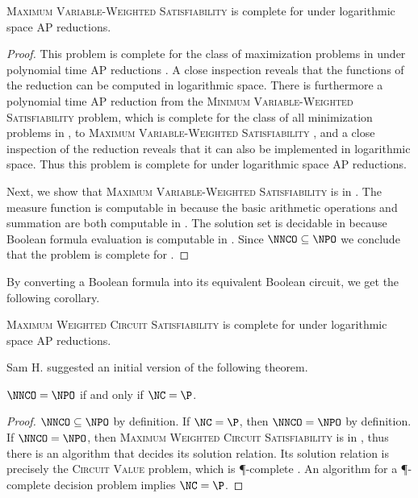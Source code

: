 \documentclass[]{article}
\begin{document}
\begin{theorem}
  \textsc{Maximum Variable-Weighted Satisfiability} is complete for \NNCO{} under logarithmic space AP reductions.
\end{theorem}
\begin{proof}
  This problem is complete for the class of maximization problems in \NPO{} under polynomial time AP reductions \cite[Theorem~3.1]{om87}.
  A close inspection reveals that the functions of the reduction can be computed in logarithmic space.
  There is furthermore a polynomial time AP reduction from the \textsc{Minimum Variable-Weighted Satisfiability} problem, which is complete for the class of all minimization problems in \NPO, to \textsc{Maximum Variable-Weighted Satisfiability} \cite[Theorem~8.4]{acgkmp99}, and a close inspection of the reduction reveals that it can also be implemented in logarithmic space.
  Thus this problem is complete for \NPO{} under logarithmic space AP reductions.

  Next, we show that \textsc{Maximum Variable-Weighted Satisfiability} is in \NNCO.
  The measure function is computable in \FNC{} because the basic arithmetic operations and summation are both computable in \FNC{}.
  The solution set is decidable in \NC{} because Boolean formula evaluation is computable in \NC{} \cite{buss87}.
  Since $\NNCO \subseteq \NPO$ we conclude that the problem is complete for \NNCO.
\end{proof}

By converting a Boolean formula into its equivalent Boolean circuit, we get the following corollary.

\begin{corollary}
  \textsc{Maximum Weighted Circuit Satisfiability} is complete for \NPO{} under logarithmic space AP reductions.
\end{corollary}

Sam H. suggested an initial version of the following theorem.

\begin{theorem}\label{thm:nnconpo}
  $\NNCO = \NPO$ if and only if $\NC = \P$.
\end{theorem}
\begin{proof}
  $\NNCO \subseteq \NPO$ by definition.
  If $\NC = \P$, then $\NNCO = \NPO$ by definition.
  If $\NNCO = \NPO$, then \textsc{Maximum Weighted Circuit Satisfiability} is in \NNCO{}, thus there is an \NC{} algorithm that decides its solution relation.
  Its solution relation is precisely the \textsc{Circuit Value} problem, which is \P-complete \cite[Problem~A.1.1]{ghr95}.
  An \NC{} algorithm for a \P-complete decision problem implies $\NC = \P$.
\end{proof}
\end{document}
